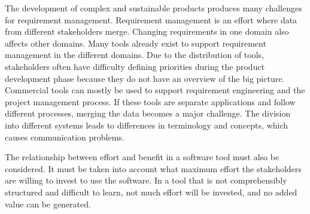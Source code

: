 
    The development of complex and sustainable products produces many challenges for requirement management. Requirement management is an effort where data from different stakeholders merge. 
    Changing requirements in one domain also affects other domains. Many tools already exist to support requirement management in the different domains. Due to the distribution of tools, stakeholders often have difficulty defining priorities during the product development phase because they do not have an overview of the big picture. Commercial tools can mostly be used to support requirement engineering and the project management process. If these tools are separate applications and follow different processes, merging the data becomes a major challenge. The division into different systems leads to differences in terminology and concepts, which causes communication problems.~\cite{Jorma2014} 




    The relationship between effort and benefit in a software tool must also be considered. It must be taken into account what maximum effort the stakeholders are willing to invest to use the software. In a tool that is not comprehensibly structured and difficult to learn, not much effort will be invested, and no added value can be generated.~\cite{RICHTER2020271}

